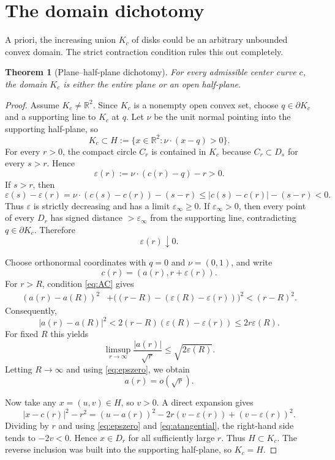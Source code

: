 \documentclass[11pt]{article}
\newtheorem{theorem}{Theorem}[section]
\newcommand{\R}{\mathbb{R}}
\begin{document}
\section{The domain dichotomy}

A priori, the increasing union $K_c$ of disks could be an arbitrary unbounded convex domain. The strict contraction condition rules this out completely.

\begin{theorem}[Plane--half-plane dichotomy]\label{thm:dichotomy}
For every admissible center curve $c$, the domain $K_c$ is either the entire plane or an open half-plane.
\end{theorem}

\begin{proof}
Assume $K_c\ne\R^2$. Since $K_c$ is a nonempty open convex set, choose $q\in\partial K_c$ and a supporting line to $K_c$ at $q$. Let $\nu$ be the unit normal pointing into the supporting half-plane, so
\[
K_c\subset H:=\{x\in\R^2:\nu\cdot(x-q)>0\}.
\]
For every $r>0$, the compact circle $C_r$ is contained in $K_c$ because $C_r\subset D_s$ for every $s>r$. Hence
\[
\varepsilon(r):=\nu\cdot(c(r)-q)-r>0.
\]
If $s>r$, then
\[
\varepsilon(s)-\varepsilon(r)
=\nu\cdot(c(s)-c(r))-(s-r)
\le |c(s)-c(r)|-(s-r)<0.
\]
Thus $\varepsilon$ is strictly decreasing and has a limit $\varepsilon_\infty\ge0$. If $\varepsilon_\infty>0$, then every point of every $D_r$ has signed distance $>\varepsilon_\infty$ from the supporting line, contradicting $q\in\partial K_c$. Therefore
\[
\varepsilon(r)\downarrow0.
\tag{5.1}\label{eq:epszero}
\]

Choose orthonormal coordinates with $q=0$ and $\nu=(0,1)$, and write
\[
c(r)=(a(r),r+\varepsilon(r)).
\]
For $r>R$, condition \eqref{eq:AC} gives
\begin{align*}
(a(r)-a(R))^2
&+\bigl((r-R)-(\varepsilon(R)-\varepsilon(r))\bigr)^2
<(r-R)^2.
\end{align*}
Consequently,
\[
|a(r)-a(R)|^2
<2(r-R)(\varepsilon(R)-\varepsilon(r))
\le 2r\varepsilon(R).
\]
For fixed $R$ this yields
\[
\limsup_{r\to\infty}\frac{|a(r)|}{\sqrt r}
\le\sqrt{2\varepsilon(R)}.
\]
Letting $R\to\infty$ and using \eqref{eq:epszero}, we obtain
\[
a(r)=o(\sqrt r).
\tag{5.2}\label{eq:atangential}
\]

Now take any $x=(u,v)\in H$, so $v>0$. A direct expansion gives
\[
|x-c(r)|^2-r^2
=(u-a(r))^2-2r(v-\varepsilon(r))+(v-\varepsilon(r))^2.
\]
Dividing by $r$ and using \eqref{eq:epszero} and \eqref{eq:atangential}, the right-hand side tends to $-2v<0$. Hence $x\in D_r$ for all sufficiently large $r$. Thus $H\subset K_c$. The reverse inclusion was built into the supporting half-plane, so $K_c=H$.
\end{proof}
\end{document}
